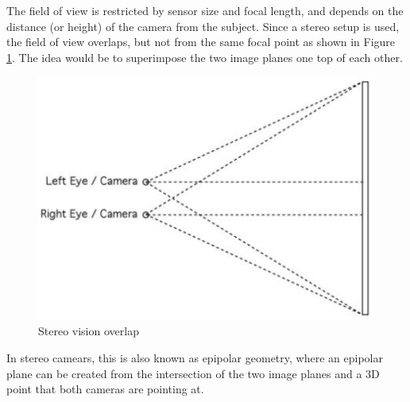 The field of view is restricted by sensor size and focal length, and depends on the distance (or height) of the camera from the subject. Since a stereo setup is used, the field of view overlaps, but not from the same focal point as shown in Figure \ref{fig:stereo_overlap}. The idea would be to superimpose the two image planes one top of each other.

\begin{figure}[H]
\centering
\includegraphics[scale=0.45]{images/stero_overlap.jpg}
\caption{Stereo vision overlap}
\label{fig:stereo_overlap}
\end{figure}

In stereo camears, this is also known as epipolar geometry, where an epipolar plane can be created from the intersection of the two image planes and a 3D point that both cameras are pointing at.

